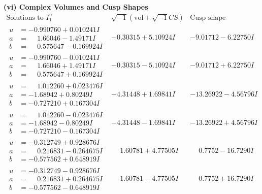 \documentclass[1p]{elsarticle_modified}
\theoremstyle{definition}
\newcommand{\I}{\sqrt{-1}}
\begin{document}
\newpage\flushleft \textbf{(vi) Complex Volumes and Cusp Shapes}
$$\begin{array}{c|c|c}  
\text{Solutions to }I^u_{1}& \I (\text{vol} + \sqrt{-1}CS) & \text{Cusp shape}\\
 \hline 
\begin{aligned}
u &= -0.990760 + 0.010241 I \\
a &= \phantom{-}1.66046 - 1.49171 I \\
b &= \phantom{-}0.575647 - 0.169924 I\end{aligned}
 & -0.30315 + 5.10924 I & -9.01712 - 6.22750 I \\ \hline\begin{aligned}
u &= -0.990760 - 0.010241 I \\
a &= \phantom{-}1.66046 + 1.49171 I \\
b &= \phantom{-}0.575647 + 0.169924 I\end{aligned}
 & -0.30315 - 5.10924 I & -9.01712 + 6.22750 I \\ \hline\begin{aligned}
u &= \phantom{-}1.012260 + 0.023476 I \\
a &= -1.68942 + 0.80249 I \\
b &= -0.727210 + 0.167304 I\end{aligned}
 & -4.31448 + 1.69841 I & -13.26922 - 4.56796 I \\ \hline\begin{aligned}
u &= \phantom{-}1.012260 - 0.023476 I \\
a &= -1.68942 - 0.80249 I \\
b &= -0.727210 - 0.167304 I\end{aligned}
 & -4.31448 - 1.69841 I & -13.26922 + 4.56796 I \\ \hline\begin{aligned}
u &= -0.312749 + 0.928676 I \\
a &= \phantom{-}0.216831 - 0.264675 I \\
b &= -0.577562 + 0.648919 I\end{aligned}
 & \phantom{-}1.60781 + 4.77505 I & \phantom{-}0.7752 - 16.7290 I \\ \hline\begin{aligned}
u &= -0.312749 - 0.928676 I \\
a &= \phantom{-}0.216831 + 0.264675 I \\
b &= -0.577562 - 0.648919 I\end{aligned}
 & \phantom{-}1.60781 - 4.77505 I & \phantom{-}0.7752 + 16.7290 I \\ \hline\begin{aligned}

\end{aligned}
\end{array}$$
\end{document}
